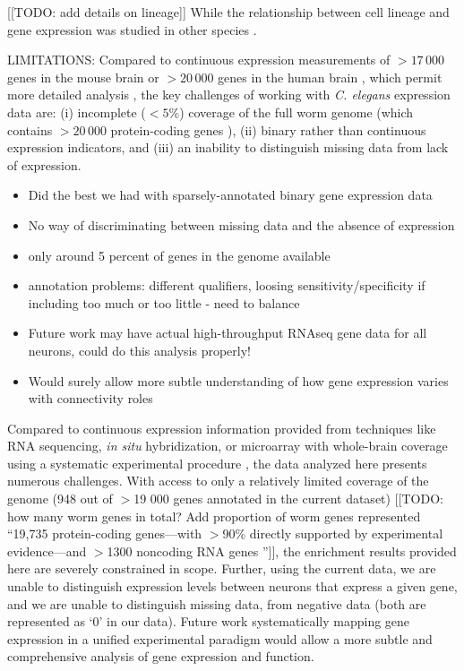 \documentclass[10pt,letterpaper]{article}
\begin{document}
[[TODO: add details on lineage]] While the relationship between cell lineage and gene expression was studied in other species \cite{Cui2007, Kluger2004}.

LIMITATIONS:
Compared to continuous expression measurements of $>17\,000$ genes in the mouse brain \cite{Lein:2007jn} or $>20\,000$ genes in the human brain \cite{Hawrylycz:2012ky}, which permit more detailed analysis \cite{Fulcher:2016ck, Ji:2014jw, Fakhry:2015kl, French2011, Vertes2016a, Parkes:2017dn}, the key challenges of working with \emph{C. elegans} expression data are:
(i) incomplete ($<5$\%) coverage of the full worm genome (which contains $>20\,000$ protein-coding genes \cite{Harris:2009kd}),
(ii) binary rather than continuous expression indicators, and
(iii) an inability to distinguish missing data from lack of expression.
\begin{itemize}
    \item Did the best we had with sparsely-annotated binary gene expression data
    \item No way of discriminating between missing data and the absence of expression
    \item only around 5 percent of genes in the genome available
    \item annotation problems: different qualifiers, loosing sensitivity/specificity if including too much or too little - need to balance
    \item Future work may have actual high-throughput RNAseq gene data for all neurons, could do this analysis properly!
    \item Would surely allow more subtle understanding of how gene expression varies with connectivity roles
\end{itemize}

Compared to continuous expression information provided from techniques like RNA sequencing, \emph{in situ} hybridization, or microarray with whole-brain coverage using a systematic experimental procedure \cite{Lein:2007jn, Shen:2012ua, Tasic:2016jp}, the data analyzed here presents numerous challenges.
With access to only a relatively limited coverage of the genome (948 out of $>$19 000 genes \cite{Hillier2005} annotated in the current dataset) [[TODO: how many worm genes in total? Add proportion of worm genes represented ``19,735 protein-coding genes—with $>$90\% directly supported by experimental evidence—and $>$1300 noncoding RNA genes \cite{Hillier2005}'']], the enrichment results provided here are severely constrained in scope.
Further, using the current data, we are unable to distinguish expression levels between neurons that express a given gene, and we are unable to distinguish missing data, from negative data (both are represented as `0' in our data).
Future work systematically mapping gene expression in a unified experimental paradigm would allow a more subtle and comprehensive analysis of gene expression and function.
\end{document}
